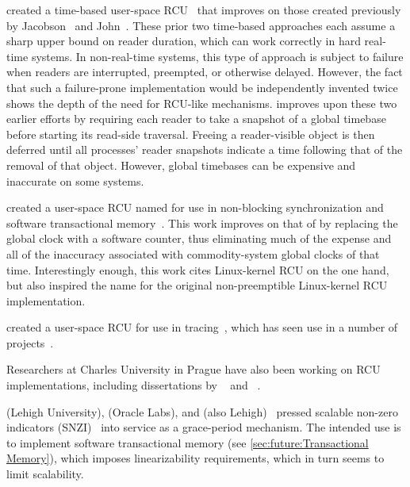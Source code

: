  created a time-based user-space
RCU~\cite{TimothyLHarris2001} that improves on those created previously
by Jacobson~\cite{Jacobson93} and John~\cite{AjuJohn95}.
These prior two time-based approaches each assume a sharp upper bound on
reader duration, which can work correctly in hard real-time systems.
In non-real-time systems, this type of approach is subject to failure
when readers are interrupted, preempted, or otherwise delayed.
However, the fact that such a failure-prone implementation would be
independently invented twice shows the depth of the need for RCU-like
mechanisms.
 improves upon these two earlier efforts by
requiring each reader to take a snapshot of a global timebase before
starting its read-side traversal.
Freeing a reader-visible object is then deferred until all processes'
reader snapshots indicate a time following that of the removal of that object.
However, global timebases can be expensive and inaccurate on some systems.

 created a user-space RCU named  for use in
non-blocking synchronization and software transactional
memory~\cite{KeirAnthonyFraserPhD,UCAM-CL-TR-579,KeirFraser2007withoutLocks}.
This work improves on that of  by replacing the
global clock with a software counter, thus eliminating much of the
expense and all of the inaccuracy associated with commodity-system
global clocks of that time.
Interestingly enough, this work cites Linux-kernel RCU on the one hand,
but also inspired the name  for the original non-preemptible
Linux-kernel RCU implementation.

 created a user-space RCU for use in
tracing~\cite{MathieuDesnoyers2009URCU,MathieuDesnoyersPhD,MathieuDesnoyers2012URCU},
which has seen use in a number of projects~\cite{MikeDay2013RCUqemu}.

Researchers at Charles University in Prague have also been
working on RCU implementations, including dissertations by
~\cite{AndrejPodzimek2010masters} and
~\cite{AdamHraska2013RCUHelenOS}.

 (Lehigh University),  (Oracle Labs), and
 (also Lehigh)~\cite{Liu:2013:MSA:2549695.2549732}
pressed scalable non-zero indicators
(SNZI)~\cite{FaithEllen:2007:SNZI} into service as a grace-period
mechanism.
The intended use is to implement software transactional memory
(see \cref{sec:future:Transactional Memory}), which
imposes linearizability requirements, which in turn seems to
limit scalability.


